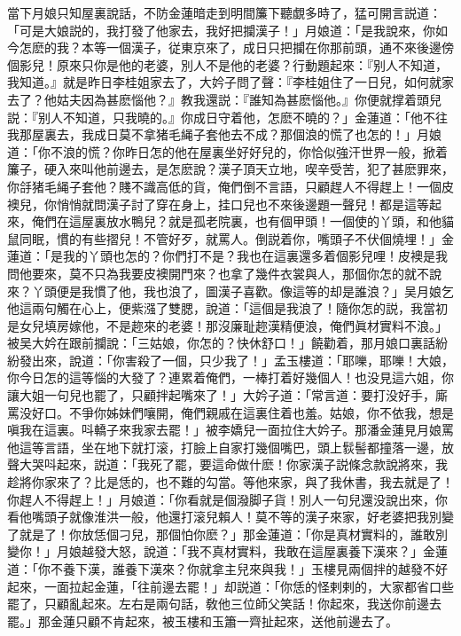 當下月娘只知屋裏說話，不防金蓮暗走到明間簾下聽覷多時了，猛可開言説道：「可是大娘説的，我打發了他家去，我好把攔漢子！」月娘道：「是我說來，你如今怎麽的我？本等一個漢子，従東京來了，成日只把攔在你那前頭，通不來後邊傍個影兒！原來只你是他的老婆，別人不是他的老婆？行動題起來：『别人不知道，我知道。』就是昨日李桂姐家去了，大妗子問了聲：『李桂姐住了一日兒，如何就家去了？他姑夫因為甚麽惱他？』教我還説：『誰知為甚麽惱他。』你便就撑着頭兒説：『别人不知道，只我曉的。』你成日守着他，怎麽不曉的？」金蓮道：「他不往我那屋裏去，我成日莫不拿猪毛䋲子套他去不成？那個浪的慌了也怎的！」月娘道：「你不浪的慌？你昨日怎的他在屋裏坐好好兒的，你恰似強汗世界一般，掀着簾子，硬入來叫他前邊去，是怎麽說？漢子頂天立地，喫辛受苦，犯了甚麽罪來，你㧱猪毛䋲子套他？賤不識高低的貨，俺們倒不言語，只顧趕人不得趕上！一個皮襖兒，你悄悄就問漢子討了穿在身上，挂口兒也不來後邊題一聲兒！都是這等起來，俺們在這屋裏放水鴨兒？就是孤老院裏，也有個甲頭！一個使的丫頭，和他貓鼠同眠，慣的有些摺兒！不管好歹，就罵人。倒説着你，嘴頭子不伏個燒埋！」金蓮道：「是我的丫頭也怎的？你們打不是？我也在這裏還多着個影兒哩！皮襖是我問他要來，莫不只為我要皮襖開門來？也拿了幾件衣裳與人，那個你怎的就不說來？丫頭便是我慣了他，我也浪了，圖漢子喜歡。像這等的却是誰浪？」吴月娘乞他這兩句觸在心上，便紫漒了雙腮，說道：「這個是我浪了！隨你怎的説，我當初是女兒填房嫁他，不是趂來的老婆！那沒廉耻趂漢精便浪，俺們眞材實料不浪。」被吴大妗在跟前攔說：「三姑娘，你怎的？快休舒口！」饒勸着，那月娘口裏話紛紛發出來，說道：「你害殺了一個，只少我了！」孟玉樓道：「耶嚛，耶嚛！大娘，你今日怎的這等惱的大發了？連累着俺們，一棒打着好幾個人！也没見這六姐，你讓大姐一句兒也罷了，只顧拌起嘴來了！」大妗子道：「常言道：要打没好手，廝罵没好口。不爭你姊妹們嚷開，俺們親戚在這裏住着也羞。姑娘，你不依我，想是嗔我在這裏。呌轎子來我家去罷！」被李嬌兒一面拉住大妗子。那潘金蓮見月娘罵他這等言語，坐在地下就打滚，打臉上自家打幾個嘴巴，頭上䯼髻都撞落一邊，放聲大哭呌起來，説道：「我死了罷，要這命做什麽！你家漢子説條念款說將來，我趁將你家來了？比是恁的，也不難的勾當。等他來家，與了我休書，我去就是了！你趕人不得趕上！」月娘道：「你看就是個潑脚子貨！別人一句兒還没說出來，你看他嘴頭子就像淮洪一般，他還打滚兒賴人！莫不等的漢子來家，好老婆把我別變了就是了！你放恁個刁兒，那個怕你麽？」那金蓮道：「你是真材實料的，誰敢別變你！」月娘越發大怒，說道：「我不真材實料，我敢在這屋裏養下漢來？」金蓮道：「你不養下漢，誰養下漢來？你就拿主兒來與我！」玉樓見兩個拌的越發不好起來，一面拉起金蓮，「往前邊去罷！」却説道：「你恁的怪剌剌的，大家都省口些罷了，只顧亂起來。左右是兩句話，敎他三位師父笑話！你起來，我送你前邊去罷。」那金蓮只顧不肯起來，被玉樓和玉簫一齊扯起來，送他前邊去了。

